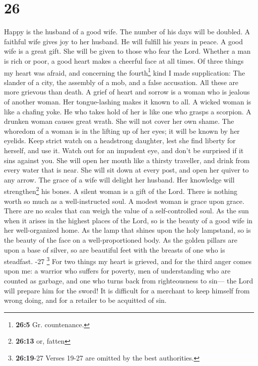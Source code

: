 \hypertarget{section-22}{%
\section{26}\label{section-22}}

 Happy is the husband of a good wife. The number of his
days will be doubled.  A faithful wife gives joy to her
husband. He will fulfill his years in peace.  A good wife
is a great gift. She will be given to those who fear the Lord.
 Whether a man is rich or poor, a good heart makes a
cheerful face at all times.  Of three things my heart was
afraid, and concerning the fourth\footnote{\textbf{26:5} Gr.
  countenance.} kind I made supplication: The slander of a city, the
assembly of a mob, and a false accusation. All these are more grievous
than death.  A grief of heart and sorrow is a woman who is
jealous of another woman. Her tongue-lashing makes it known to all.
 A wicked woman is like a chafing yoke. He who takes hold
of her is like one who grasps a scorpion.  A drunken woman
causes great wrath. She will not cover her own shame.  The
whoredom of a woman is in the lifting up of her eyes; it will be known
by her eyelids.  Keep strict watch on a headstrong
daughter, lest she find liberty for herself, and use it. 
Watch out for an impudent eye, and don't be surprised if it sins against
you.  She will open her mouth like a thirsty traveller,
and drink from every water that is near. She will sit down at every
post, and open her quiver to any arrow.  The grace of a
wife will delight her husband. Her knowledge will strengthen\footnote{\textbf{26:13}
  or, fatten} his bones.  A silent woman is a gift of the
Lord. There is nothing worth so much as a well-instructed soul.
 A modest woman is grace upon grace. There are no scales
that can weigh the value of a self-controlled soul.  As
the sun when it arises in the highest places of the Lord, so is the
beauty of a good wife in her well-organized home.  As the
lamp that shines upon the holy lampstand, so is the beauty of the face
on a well-proportioned body.  As the golden pillars are
upon a base of silver, so are beautiful feet with the breasts of one who
is steadfast. -27 \footnote{\textbf{26:19}-27 Verses
  19-27 are omitted by the best authorities.}  For two
things my heart is grieved, and for the third anger comes upon me: a
warrior who suffers for poverty, men of understanding who are counted as
garbage, and one who turns back from righteousness to sin--- the Lord
will prepare him for the sword!  It is difficult for a
merchant to keep himself from wrong doing, and for a retailer to be
acquitted of sin.

